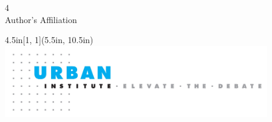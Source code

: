 \begin{titlepage}
\begin{multicols}{4}
        \\
        Author's Affiliation
    \end{multicols}
    
    \vspace{-0.75cm}
    

    \begin{textblock*}{4.5in}[1, 1](5.5in, 10.5in)
        \noindent\includegraphics[width=4.5in]{images/cover-footer.jpg}
    \end{textblock*}
\end{titlepage}